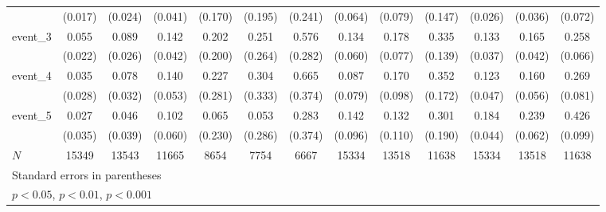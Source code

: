 {\begin{tabular}{l*{12}{c}}
            &     (0.017)         &     (0.024)         &     (0.041)         &     (0.170)         &     (0.195)         &     (0.241)         &     (0.064)         &     (0.079)         &     (0.147)         &     (0.026)         &     (0.036)         &     (0.072)         \\
[1em]
event\_3     &       0.055\sym{*}  &       0.089\sym{***}&       0.142\sym{***}&       0.202         &       0.251         &       0.576\sym{*}  &       0.134\sym{*}  &       0.178\sym{*}  &       0.335\sym{*}  &       0.133\sym{***}&       0.165\sym{***}&       0.258\sym{***}\\
            &     (0.022)         &     (0.026)         &     (0.042)         &     (0.200)         &     (0.264)         &     (0.282)         &     (0.060)         &     (0.077)         &     (0.139)         &     (0.037)         &     (0.042)         &     (0.066)         \\
[1em]
event\_4     &       0.035         &       0.078\sym{*}  &       0.140\sym{**} &       0.227         &       0.304         &       0.665         &       0.087         &       0.170         &       0.352\sym{*}  &       0.123\sym{**} &       0.160\sym{**} &       0.269\sym{***}\\
            &     (0.028)         &     (0.032)         &     (0.053)         &     (0.281)         &     (0.333)         &     (0.374)         &     (0.079)         &     (0.098)         &     (0.172)         &     (0.047)         &     (0.056)         &     (0.081)         \\
[1em]
event\_5     &       0.027         &       0.046         &       0.102         &       0.065         &       0.053         &       0.283         &       0.142         &       0.132         &       0.301         &       0.184\sym{***}&       0.239\sym{***}&       0.426\sym{***}\\
            &     (0.035)         &     (0.039)         &     (0.060)         &     (0.230)         &     (0.286)         &     (0.374)         &     (0.096)         &     (0.110)         &     (0.190)         &     (0.044)         &     (0.062)         &     (0.099)         \\
\hline
\(N\)       &       15349         &       13543         &       11665         &        8654         &        7754         &        6667         &       15334         &       13518         &       11638         &       15334         &       13518         &       11638         \\
\hline\hline
\multicolumn{13}{l}{\footnotesize Standard errors in parentheses}\\
\multicolumn{13}{l}{\footnotesize \sym{*} \(p<0.05\), \sym{**} \(p<0.01\), \sym{***} \(p<0.001\)}\\
\end{tabular}
}
